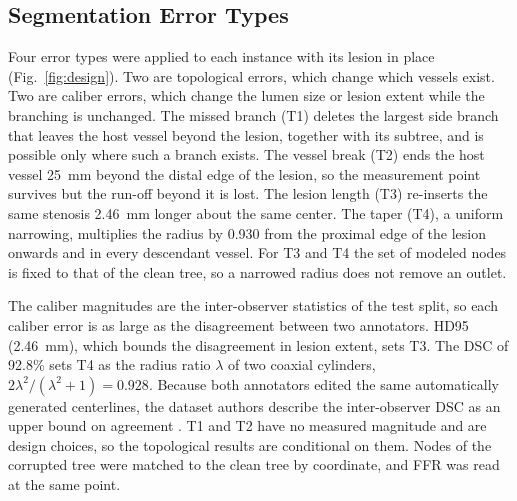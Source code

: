 \documentclass[journal,twoside,web]{ieeecolor}
\begin{document}
\subsection{Segmentation Error Types}
Four error types were applied to each instance with its lesion in place (Fig.~\ref{fig:design}). Two are
topological errors, which change which vessels exist. Two are caliber errors, which change the lumen size or lesion
extent while the branching is unchanged. The missed branch (T1) deletes the largest side branch that leaves the host
vessel beyond the lesion, together with its subtree, and is possible only where such a branch exists. The vessel break (T2) ends the host vessel 25~mm beyond the
distal edge of the lesion, so the measurement point survives but the run-off beyond it is lost. The lesion length
(T3) re-inserts the same stenosis 2.46~mm longer about the same center. The taper (T4), a uniform narrowing, multiplies the radius by 0.930 from the proximal
edge of the lesion onwards and in every descendant vessel. For T3 and T4 the set of modeled nodes is fixed to that
of the clean tree, so a narrowed radius does not remove an outlet.

The caliber magnitudes are the inter-observer statistics of the test split, so each caliber error is as large as
the disagreement between two annotators. HD95 (2.46~mm), which bounds the disagreement in lesion extent, sets T3. The DSC of 92.8\% sets T4 as the radius
ratio $\lambda$ of two coaxial cylinders, $2\lambda^2/(\lambda^2+1) = 0.928$. Because both annotators edited the same automatically
generated centerlines, the dataset authors describe the inter-observer DSC as an upper bound on agreement \cite{bransby2026}. T1 and T2 have
no measured magnitude and are design choices, so the topological results are conditional on them. Nodes of the corrupted tree were matched to the clean tree by
coordinate, and FFR was read at the same point.
\end{document}

